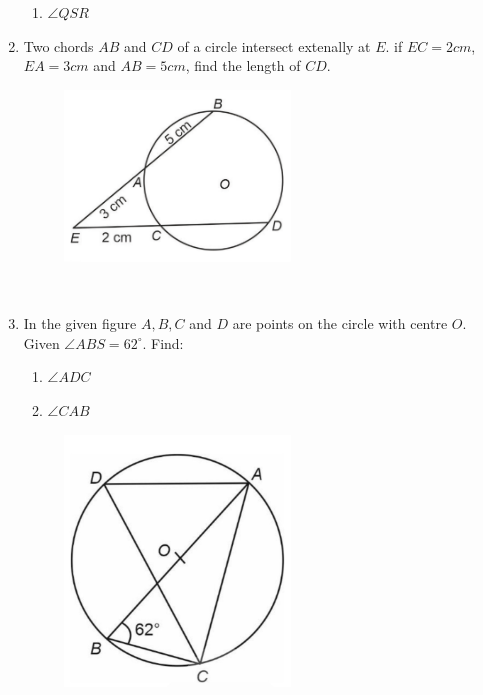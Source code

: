 \documentclass{article}
\begin{document}
\begin{enumerate}
\begin{enumerate}
			\item $\angle QSR$
		\end{enumerate}
	\item Two chords $AB$ and $CD$ of a circle intersect extenally at $E$. if $EC = 2 cm$, $EA = 3 cm$ and $AB = 5 cm$, find the length of $CD$.
		\begin{figure}[h]
			\centering
			\includegraphics[width=60mm]{figs/img4.jpg}
			\label{figure}
		\end{figure}\\
	\item In the given figure $A,B,C$ and $D$ are points on the circle with centre $O$. Given $\angle ABS = 62^{\circ}$. Find:
		\begin{enumerate}
			\item $\angle ADC$
			\item $\angle CAB$
		\end{enumerate}
		\begin{figure}[h]
			\centering
			\includegraphics[width=60mm]{figs/img5.jpg}
			\label{figure}
		\end{figure}
\end{enumerate}  
\end{document}
